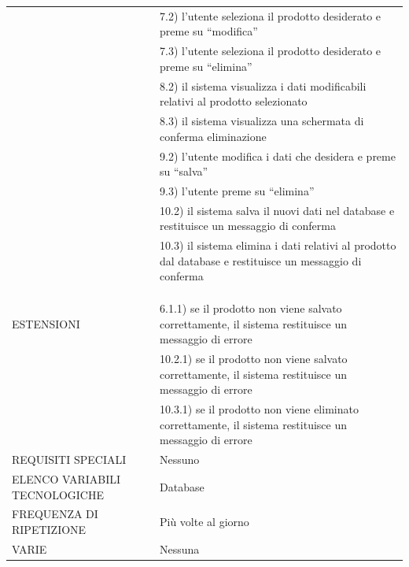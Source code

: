 \documentclass[a4paper, titlepage]{article}
\begin{document}
\begin{longtable}{p{6cm}p{7cm}}
    & 7.2) l’utente seleziona il prodotto desiderato e preme su “modifica”\\
    & 7.3) l’utente seleziona il prodotto desiderato e preme su “elimina”\\
    & 8.2) il sistema visualizza i dati modificabili relativi al prodotto selezionato\\
    & 8.3) il sistema visualizza una schermata di conferma eliminazione\\
    & 9.2) l’utente modifica i dati che desidera e preme su “salva”\\
    & 9.3) l’utente preme su “elimina”\\
    & 10.2) il sistema salva il nuovi dati nel database e restituisce un messaggio di conferma\\
    & 10.3) il sistema elimina i dati relativi al prodotto dal database e restituisce un messaggio di conferma\\\\\\\\\midrule
    ESTENSIONI
    & 6.1.1) se il prodotto non viene salvato correttamente, il sistema restituisce un messaggio di errore\\
    & 10.2.1) se il prodotto non viene salvato correttamente, il sistema restituisce un messaggio di errore\\
    & 10.3.1) se il prodotto non viene eliminato correttamente, il sistema restituisce un messaggio di errore \\\midrule
    REQUISITI SPECIALI & Nessuno\\\midrule
    ELENCO VARIABILI TECNOLOGICHE & Database\\\midrule
    FREQUENZA DI RIPETIZIONE & Più volte al giorno\\\midrule
    VARIE & Nessuna\\\bottomrule
\end{longtable}
\vphantom{}
\end{document}
